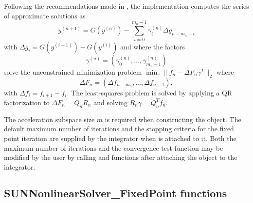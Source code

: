 Following the recommendations made in \cite{Walker-Ni09}, the
{\sunnonlinsolfixedpoint} implementation computes the series of approximate
solutions as
\begin{equation}\label{e:accelerated_fixed_point_iteration_impl}
y^{(n+1)} = G(y^{(n)})-\sum_{i=0}^{m_n-1} \gamma_i^{(n)} \Delta g_{n-m_n+i}
\end{equation}
with $\Delta g_i = G(y^{(i+1)}) - G(y^{(i)})$ and where the factors
\begin{equation}
\gamma^{(n)} =(\gamma_0^{(n)}, \ldots, \gamma_{m_n-1}^{(n)})
\end{equation}
solve the unconstrained minimization problem
 $\min_\gamma \| f_n - \Delta F_n \gamma^T \|_2$ where 
\begin{equation}
\Delta F_{n} = (\Delta f_{n-m_n}, \ldots, \Delta f_{n-1}),
\end{equation}
with $\Delta f_i = f_{i+1} - f_i$. The least-squares problem is solved by
applying a QR factorization to $\Delta F_n = Q_n R_n$ and solving
 $R_n \gamma = Q_n^T f_n$.

The acceleration subspace size $m$ is required when constructing the
{\sunnonlinsolfixedpoint} object.  The default maximum number of
iterations and the stopping criteria for the fixed point iteration are
supplied by the {\sundials} integrator when {\sunnonlinsolfixedpoint}
is attached to it.  Both the maximum number of iterations and the
convergence test function may be modified by the user by calling
 and 
functions after attaching the {\sunnonlinsolfixedpoint} object to the
integrator.

\subsection{SUNNonlinearSolver\_FixedPoint functions}
\label{ss:sunnonlinsolfixedpoint_functions}

